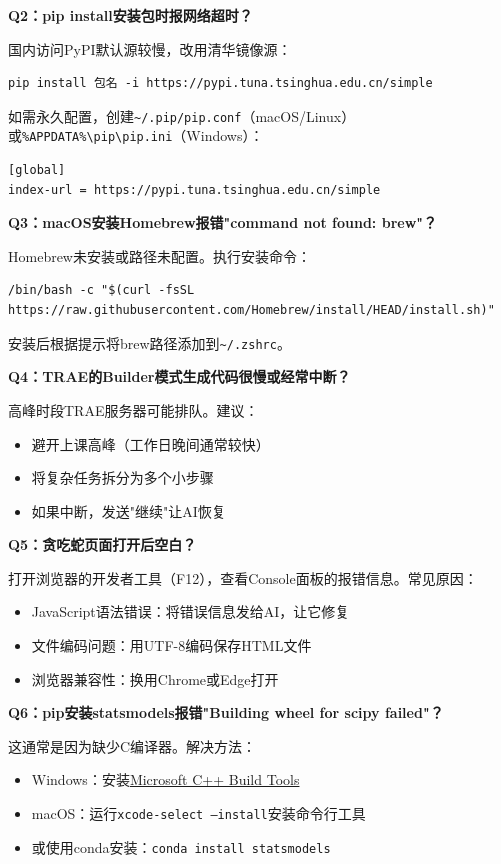 \textbf{Q2：pip install安装包时报网络超时？}

国内访问PyPI默认源较慢，改用清华镜像源：

\begin{lstlisting}[style=shell]
pip install 包名 -i https://pypi.tuna.tsinghua.edu.cn/simple
\end{lstlisting}

如需永久配置，创建\texttt{\textasciitilde/.pip/pip.conf}（macOS/Linux）或\texttt{\%APPDATA\%\textbackslash pip\textbackslash pip.ini}（Windows）：

\begin{lstlisting}
[global]
index-url = https://pypi.tuna.tsinghua.edu.cn/simple
\end{lstlisting}

\textbf{Q3：macOS安装Homebrew报错"command not found: brew"？}

Homebrew未安装或路径未配置。执行安装命令：

\begin{lstlisting}[style=shell]
/bin/bash -c "$(curl -fsSL https://raw.githubusercontent.com/Homebrew/install/HEAD/install.sh)"
\end{lstlisting}

安装后根据提示将brew路径添加到\texttt{\textasciitilde/.zshrc}。

\textbf{Q4：TRAE的Builder模式生成代码很慢或经常中断？}

高峰时段TRAE服务器可能排队。建议：
\begin{itemize}[leftmargin=2em]
  \item 避开上课高峰（工作日晚间通常较快）
  \item 将复杂任务拆分为多个小步骤
  \item 如果中断，发送"继续"让AI恢复
\end{itemize}

\textbf{Q5：贪吃蛇页面打开后空白？}

打开浏览器的开发者工具（F12），查看Console面板的报错信息。常见原因：
\begin{itemize}[leftmargin=2em]
  \item JavaScript语法错误：将错误信息发给AI，让它修复
  \item 文件编码问题：用UTF-8编码保存HTML文件
  \item 浏览器兼容性：换用Chrome或Edge打开
\end{itemize}

\textbf{Q6：pip安装statsmodels报错"Building wheel for scipy failed"？}

这通常是因为缺少C编译器。解决方法：
\begin{itemize}[leftmargin=2em]
  \item Windows：安装\href{https://visualstudio.microsoft.com/visual-cpp-build-tools/}{Microsoft C++ Build Tools}
  \item macOS：运行\texttt{xcode-select --install}安装命令行工具
  \item 或使用conda安装：\texttt{conda install statsmodels}
\end{itemize}

